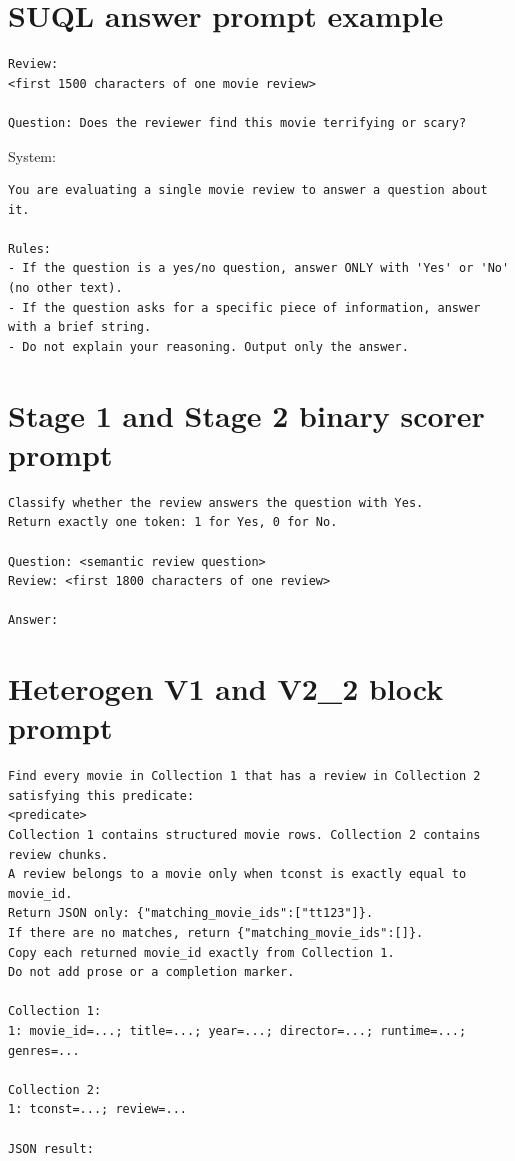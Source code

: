\documentclass[11pt,oneside]{book}
\begin{document}
\section{SUQL answer prompt example}
\begin{lstlisting}
Review:
<first 1500 characters of one movie review>

Question: Does the reviewer find this movie terrifying or scary?
\end{lstlisting}
System:
\begin{lstlisting}
You are evaluating a single movie review to answer a question about it.

Rules:
- If the question is a yes/no question, answer ONLY with 'Yes' or 'No' (no other text).
- If the question asks for a specific piece of information, answer with a brief string.
- Do not explain your reasoning. Output only the answer.
\end{lstlisting}
\section{Stage 1 and Stage 2 binary scorer prompt}
\begin{lstlisting}
Classify whether the review answers the question with Yes.
Return exactly one token: 1 for Yes, 0 for No.

Question: <semantic review question>
Review: <first 1800 characters of one review>

Answer:
\end{lstlisting}
\section{Heterogen V1 and V2\_2 block prompt}
\begin{lstlisting}
Find every movie in Collection 1 that has a review in Collection 2 satisfying this predicate:
<predicate>
Collection 1 contains structured movie rows. Collection 2 contains review chunks.
A review belongs to a movie only when tconst is exactly equal to movie_id.
Return JSON only: {"matching_movie_ids":["tt123"]}.
If there are no matches, return {"matching_movie_ids":[]}.
Copy each returned movie_id exactly from Collection 1.
Do not add prose or a completion marker.

Collection 1:
1: movie_id=...; title=...; year=...; director=...; runtime=...; genres=...

Collection 2:
1: tconst=...; review=...

JSON result:
\end{lstlisting}
\end{document}
